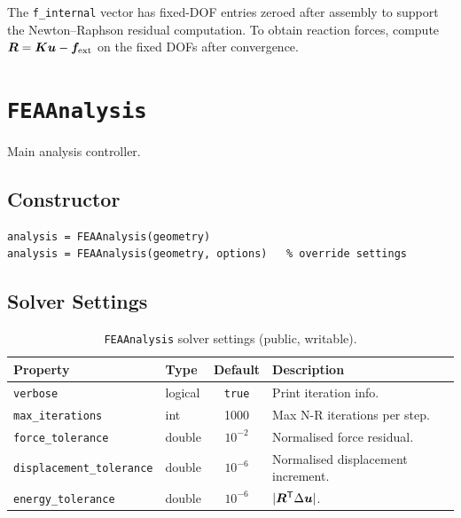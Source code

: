 \begin{warnbox}
The \texttt{f\_internal} vector has fixed-DOF entries zeroed after assembly
to support the Newton--Raphson residual computation.  To obtain reaction
forces, compute $\bm{R} = \bm{K}\bm{u} - \bm{f}_{\text{ext}}$ on
the fixed DOFs after convergence.
\end{warnbox}

\section{\texttt{FEAAnalysis}}
\label{sec:api:analysis}

Main analysis controller.

\subsection{Constructor}

\begin{lstlisting}
analysis = FEAAnalysis(geometry)
analysis = FEAAnalysis(geometry, options)   % override settings
\end{lstlisting}

\subsection{Solver Settings}

\begin{table}[H]
\centering
\caption{\texttt{FEAAnalysis} solver settings (public, writable).}
\begin{tabularx}{\textwidth}{llcX}
\toprule
\textbf{Property} & \textbf{Type} & \textbf{Default} & \textbf{Description} \\
\midrule
\texttt{verbose}               & logical & \texttt{true} & Print iteration info. \\
\texttt{max\_iterations}       & int     & 1000          & Max N-R iterations per step. \\
\texttt{force\_tolerance}      & double  & $10^{-2}$     & Normalised force residual. \\
\texttt{displacement\_tolerance} & double & $10^{-6}$    & Normalised displacement increment. \\
\texttt{energy\_tolerance}     & double  & $10^{-6}$     & $|\bm{R}^{\mathsf{T}}\Delta\bm{u}|$. \\
\bottomrule
\end{tabularx}
\end{table}

